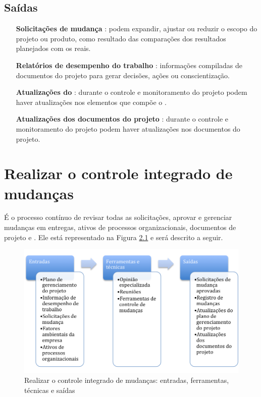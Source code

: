 \section{Saídas}

\begin{itemize}
	

	\item[\textbf{Solicitações de mudança}] : podem expandir, ajustar ou reduzir o escopo do projeto ou produto, como resultado das comparações dos resultados planejados com os reais.
	
	\item[\textbf{Relatórios de desempenho do trabalho}] : informações compiladas de documentos do projeto para gerar decisões, ações ou conscientização.

	\item[\textbf{Atualizações do \planproj}] :	durante o controle e monitoramento do projeto podem haver atualizações nos elementos que compõe o \planproj.
	
	\item[\textbf{Atualizações dos documentos do projeto}] : durante o controle e monitoramento do projeto podem haver atualizações nos documentos do projeto.
	
\end{itemize}

\chapter{Realizar o controle integrado de mudanças}

É o processo contínuo de revisar todas as solicitações, aprovar e gerenciar mudanças em entregas, ativos de processos organizacionais, documentos de projeto e \planproj. Ele está representado na Figura \ref{fig:cont:int:mudanca:etfs} e será descrito a seguir.

\begin{figure}[!h]
	\centering
	\includegraphics[scale=0.75]{Figuras/cont_int_mudanca_efts.png}
	\caption{Realizar o controle integrado de mudanças: entradas, ferramentas, técnicas e saídas}
	\label{fig:cont:int:mudanca:etfs}
\end{figure}

